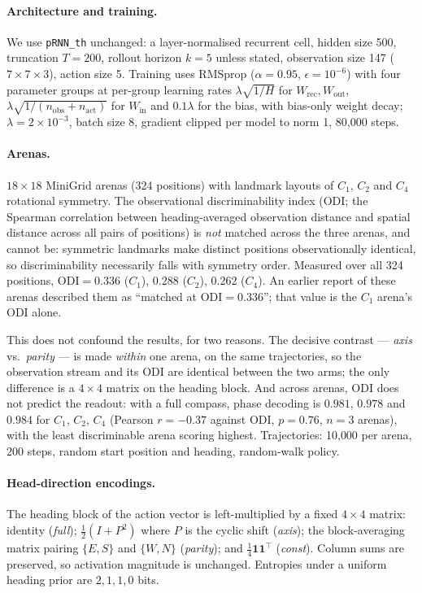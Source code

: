 \documentclass[9pt,lineno]{elife}
\begin{document}
\paragraph{Architecture and training.} We use \texttt{pRNN\_th} \citep{levenstein2024} unchanged:
a layer-normalised recurrent cell, hidden size 500, truncation $T = 200$, rollout horizon $k=5$
unless stated, observation size 147 ($7\times7\times3$), action size 5. Training uses RMSprop
($\alpha = 0.95$, $\epsilon = 10^{-6}$) with four parameter groups at per-group learning rates
$\lambda\sqrt{1/H}$ for $W_{\text{rec}}, W_{\text{out}}$, $\lambda\sqrt{1/(n_{\text{obs}} +
n_{\text{act}})}$ for $W_{\text{in}}$ and $0.1\lambda$ for the bias, with bias-only weight decay;
$\lambda = 2\times10^{-3}$, batch size 8, gradient clipped per model to norm 1, 80{,}000 steps.

\paragraph{Arenas.} $18\times18$ MiniGrid arenas (324 positions) with landmark layouts of $C_1$,
$C_2$ and $C_4$ rotational symmetry. The observational discriminability index (ODI; the Spearman
correlation between heading-averaged observation distance and spatial distance across all pairs
of positions) is \emph{not} matched across the three arenas, and cannot be: symmetric landmarks
make distinct positions observationally identical, so discriminability necessarily falls with
symmetry order. Measured over all 324 positions, $\mathrm{ODI} = 0.336$ ($C_1$), $0.288$ ($C_2$),
$0.262$ ($C_4$). An earlier report of these arenas described them as ``matched at
$\mathrm{ODI}=0.336$''; that value is the $C_1$ arena's ODI alone.

This does not confound the results, for two reasons. The decisive contrast --- \textit{axis} vs.\
\textit{parity} --- is made \emph{within} one arena, on the same trajectories, so the observation
stream and its ODI are identical between the two arms; the only difference is a $4\times4$ matrix
on the heading block. And across arenas, ODI does not predict the readout: with a full compass,
phase decoding is $0.981$, $0.978$ and $0.984$ for $C_1$, $C_2$, $C_4$ (Pearson $r=-0.37$ against
ODI, $p=0.76$, $n=3$ arenas), with the least discriminable arena scoring highest. Trajectories: 10{,}000 per
arena, 200 steps, random start position and heading, random-walk policy.

\paragraph{Head-direction encodings.} The heading block of the action vector is left-multiplied
by a fixed $4\times4$ matrix: identity (\textit{full}); $\tfrac12(I + P^2)$ where $P$ is the
cyclic shift (\textit{axis}); the block-averaging matrix pairing $\{E,S\}$ and $\{W,N\}$
(\textit{parity}); and $\tfrac14\mathbf{1}\mathbf{1}^\top$ (\textit{const}). Column sums are
preserved, so activation magnitude is unchanged. Entropies under a uniform heading prior are
$2, 1, 1, 0$ bits.
\end{document}
